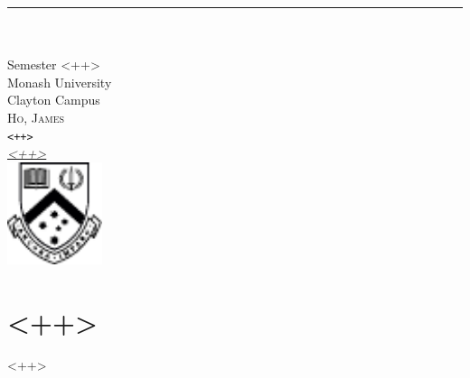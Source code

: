 \documentclass[12pt]{article}
\newcommand{\metatitle}{<++>} %
\newcommand{\metasubtitle}{<++>} %
\newcommand{\metaauthor}{Ho, James}
\newcommand{\metaemail}{<++>}
\begin{document}
\begin{titlepage}
  \raggedleft

  \rule{1pt}{\textheight}
  \hspace{0.05\textwidth}
  \parbox[b]{0.75\textwidth}{
    \vspace{\fill}
    {\Huge\bfseries \metatitle{}}\\[1cm]
    {\Large \metasubtitle{}}\\[0.1cm]
    {\large Semester <++>} \\[1.5cm] %
    {\large Monash University \\[0.1cm]Clayton Campus}\\[3cm]
    {\Large\textsc{\metaauthor} \\[0.1cm]
    \texttt{<++>} \\[0.1cm] %
\href{mailto:\metaemail{}}{\textit{\metaemail{}}}} \\[0.5cm]
    \includegraphics[height=3cm]{monash2.pdf}
    \hspace*{\fill}
    \setlength{\fboxsep}{0pt}
  }
\end{titlepage}

\section{<++>}
<++>

\newpage
\printbibliography
\end{document}
